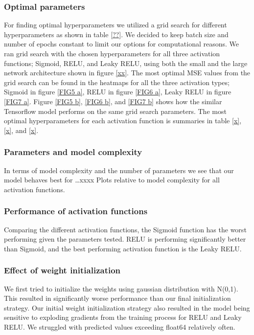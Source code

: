 \documentclass
[twocolumn,
secnumarabic,
nobibnotes,
aps,
prl,
reprint,
groupedaddress,
amsmath,
amssymb
]{revtex4-2}
\begin{document}
\subsubsection{Optimal parameters}
For finding optimal hyperparameters we utilized a grid search for different hyperparameters as shown in table \ref{??}. We decided to keep batch size and number of epochs constant to limit our options for computational reasons.  We ran grid search with the chosen hyperparameters for all three activation functions; Sigmoid, RELU, and Leaky RELU, using both the small and the large network architecture shown in figure \ref{xx}.  The most optimal MSE values from the grid search can be found in the heatmaps for all the three activation types; Sigmoid in figure \ref{FIG5 a}, RELU in figure \ref{FIG6 a}, Leaky RELU in figure \ref{FIG7 a}. Figure \ref{FIG5 b}, \ref{FIG6 b}, and \ref{FIG7 b} shows how the similar Tensorflow model performs on the same grid search parameters. The most optimal hyperparameters for each activation function is summaries in table \ref{x}, \ref{x}, and \ref{x}.




\subsubsection{Parameters and model complexity}
In terms of model complexity and the number of parameters we see that our model behaves best for …xxxx
Plots relative to model complexity for all activation functions.

\subsubsection{Performance of activation functions}
Comparing the different activation functions, the Sigmoid function has the worst performing given the parameters tested. RELU is performing significantly better than Sigmoid, and the best performing activation function is the Leaky RELU.

\subsubsection{Effect of weight initialization}
We first tried to initialize the weights using gaussian distribution with N(0,1). This resulted in significantly worse performance than our final initialization strategy. Our initial weight initialization strategy also resulted in the model being sensitive to exploding gradients from the training process for RELU and Leaky RELU. We struggled with predicted values exceeding float64 relatively often.
\end{document}
